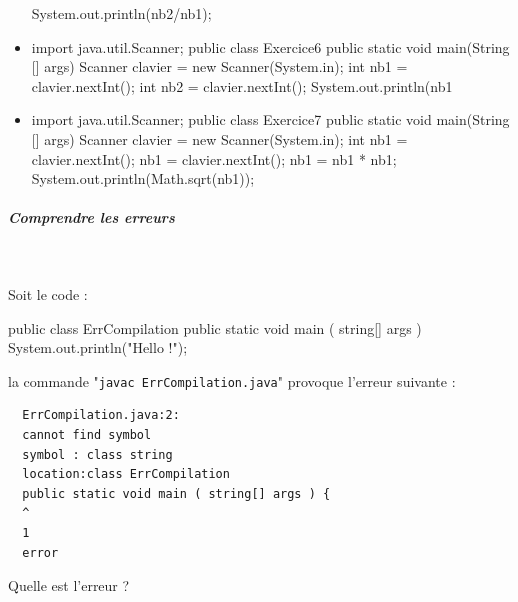 \documentclass[11pt,a4paper]{article}
\begin{document}
\begin{itemize}
\begin{Java}
{{        System.out.println(nb2/nb1);
    }
}
        \end{Java} \textcolor{gray}{\underline{\hspace*{1em}}} 
			\item \begin{Java}
import java.util.Scanner;
public class Exercice6 {
    public static void main(String [] args) {
        Scanner clavier = new Scanner(System.in);
        int nb1 = clavier.nextInt();
        int nb2 = clavier.nextInt();
        System.out.println(nb1%
    }
}
        \end{Java} \textcolor{gray}{\underline{\hspace*{1em}}} 
			\item \begin{Java}
import java.util.Scanner;
public class Exercice7 {
    public static void main(String [] args) {
        Scanner clavier = new Scanner(System.in);
        int nb1 = clavier.nextInt();
        nb1 = clavier.nextInt();
        nb1 = nb1 * nb1;
        System.out.println(Math.sqrt(nb1));
    }
}
        \end{Java} \textcolor{gray}{\underline{\hspace*{1em}}} 
					\end{itemize}
				
            \par
        
			
		\subparagraph{Comprendre les erreurs} 
		
                \textcolor{white}{.} \par
            
								Soit le code :
							
            \par
        \begin{Java}
  public class ErrCompilation{
	  public static void main ( string[] args ) {
		  System.out.println("Hello !");
	  }
  }							\end{Java}
								la commande "\verb|javac ErrCompilation.java|"  provoque l'erreur suivante :
							
            \par
        \begin{verbatim}
  ErrCompilation.java:2:
  cannot find symbol
  symbol : class string
  location:class ErrCompilation
  public static void main ( string[] args ) {
  ^ 
  1
  error						\end{verbatim}
								Quelle est l'erreur ?
							
\end{document}
